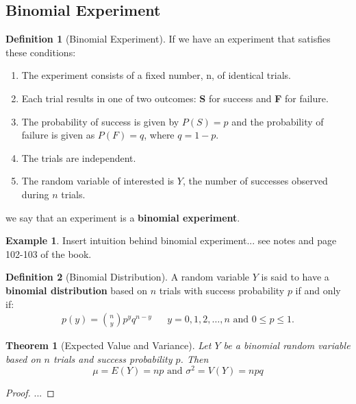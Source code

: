 \documentclass{article}
\theoremstyle{plain}
\newtheorem{thm}{Theorem}[section]
\theoremstyle{definition}
\newtheorem{defn}{Definition}[section]
\newtheorem{example}{Example}[section]
\theoremstyle{remark}
\begin{document}
\subsection{Binomial Experiment}
\begin{defn}[Binomial Experiment]  If we have an experiment that satisfies these conditions:
  \begin{enumerate}
    \item The experiment consists of a fixed number, n, of identical trials.
    \item Each trial results in one of two outcomes: \textbf{S} for success and \textbf{F} for failure.
    \item The probability of success is given by $P(S) = p$ and the probability of failure is given as $P(F) = q$, where $q = 1 - p$.
    \item The trials are independent.
    \item The random variable of interested is $Y$, the number of successes observed during $n$ trials.
  \end{enumerate}
  we say that an experiment is a \textbf{binomial experiment}.
\end{defn}

\begin{example}
Insert intuition behind binomial experiment... see notes and page 102-103 of the book.
\end{example}

\begin{defn}[Binomial Distribution] 
A random variable $Y$ is said to have a \textbf{binomial distribution} based on $n$ trials with success probability $p$ if and only if:
\begin{align*}
p(y) = {n \choose y} p^y q^{n-y} && y = 0,1,2,\ldots ,n\text{ and }0 \leq p \leq 1.
\end{align*}
\end{defn}

\begin{thm}[Expected Value and Variance] 
  Let $Y$ be a binomial random variable based on $n$ trials and success probability $p$. Then
$$
\mu = E(Y) = np \text{ and } \sigma^2 = V(Y) = npq
$$
\end{thm}
\begin{proof}
...
\end{proof}
\end{document}
